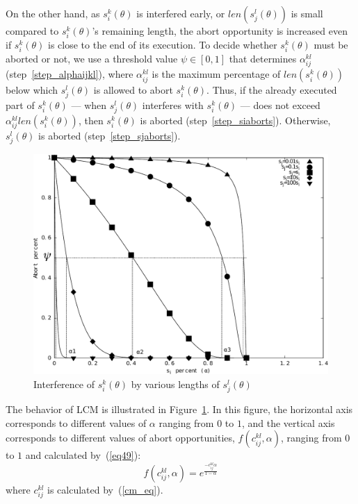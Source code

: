 \documentclass[a4paper,english]{article}
\begin{document}
On the other hand, as $s_{i}^{k}(\theta)$ is interfered early,
or $len(s_{j}^{l}(\theta))$ is small compared to $s_{i}^{k}(\theta)$'s remaining length, the abort opportunity 
is increased even if $s_i^k (\theta)$ is close to the end of its execution. To decide whether $s_{i}^{k}(\theta)$ must be aborted or not, we use a threshold value $\psi\in[0,1]$ that determines $\alpha_{ij}^{kl}$ (step~\ref{step_alphaijkl}), where $\alpha_{ij}^{kl}$ is the maximum percentage of $len(s_i^k(\theta))$ below which $s_j^l(\theta)$ is allowed to abort $s_i^k(\theta)$. Thus, if the already executed part of $s_i^k(\theta)$ --- when $s_j^l(\theta)$ interferes with $s_i^k(\theta)$ --- does not exceed $\alpha_{ij}^{kl}len(s_i^k(\theta))$, then $s_i^k(\theta)$ is aborted (step~\ref{step_siaborts}). Otherwise, $s_j^l(\theta)$ is aborted (step~\ref{step_sjaborts}).

%
\begin{figure}[htbp]
\centering
\includegraphics[scale=0.4]{figures/figure16}
\caption{\label{fig16}Interference of $s_{i}^{k}(\theta)$ by various lengths of 
$s_{j}^{l}(\theta)$}
\end{figure}

The behavior of LCM is illustrated in Figure~\ref{fig16}. In this figure, the horizontal axis corresponds to different values of $\alpha$ ranging from $0$ to $1$, and the vertical axis corresponds to different values of abort opportunities, $f(c_{ij}^{kl},\alpha)$, ranging from $0$ to $1$ and calculated by~(\ref{eq49}):
\begin{equation}
f(c_{ij}^{kl},\alpha)=e^{\frac{-c_{ij}^{kl}\alpha}{1-\alpha}}
\label{eq49}\end{equation}
where $c_{ij}^{kl}$ is calculated by~(\ref{cm_eq}).
\end{document}
